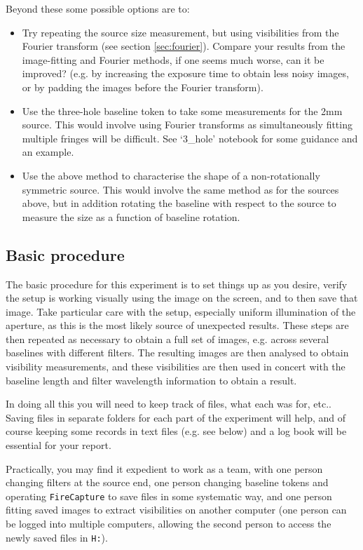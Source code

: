 \documentclass[11pt]{article}
\begin{document}
Beyond these some possible options are to:
\begin{itemize}
    \item Try repeating the source size measurement, but using visibilities from the Fourier transform (see section \ref{sec:fourier}). Compare your results from the image-fitting and Fourier methods, if one seems much worse, can it be improved? (e.g. by increasing the exposure time to obtain less noisy images, or by padding the images before the Fourier transform).
    \item Use the three-hole baseline token to take some measurements for the 2mm source. This would involve using Fourier transforms as simultaneously fitting multiple fringes will be difficult. See `3\_hole' notebook for some guidance and an example.
    \item Use the above method to characterise the shape of a non-rotationally symmetric source. This would involve the same method as for the sources above, but in addition rotating the baseline with respect to the source to measure the size as a function of baseline rotation.
\end{itemize}

\subsection{Basic procedure}

The basic procedure for this experiment is to set things up as you desire, verify the setup is working visually using the image on the screen, and to then save that image. Take particular care with the setup, especially uniform illumination of the aperture, as this is the most likely source of unexpected results. These steps are then repeated as necessary to obtain a full set of images, e.g. across several baselines with different filters. The resulting images are then analysed to obtain visibility measurements, and these visibilities are then used in concert with the baseline length and filter wavelength information to obtain a result.

In doing all this you will need to keep track of files, what each was for, etc.. Saving files in separate folders for each part of the experiment will help, and of course keeping some records in text files (e.g. see below) and a log book will be essential for your report.

Practically, you may find it expedient to work as a team, with one person changing filters at the source end, one person changing baseline tokens and operating \texttt{FireCapture} to save files in some systematic way, and one person fitting saved images to extract visibilities on another computer (one person can be logged into multiple computers, allowing the second person to access the newly saved files in \texttt{H:}).
\end{document}
